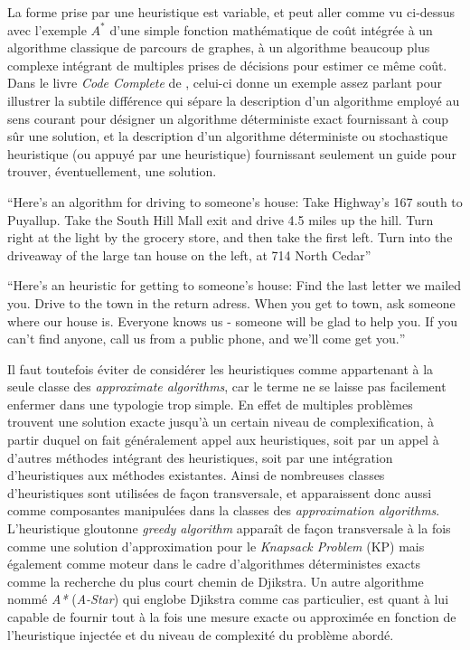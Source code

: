La forme prise par une heuristique est variable, et peut aller comme vu ci-dessus avec l'exemple $A^*$ d'une simple fonction mathématique de coût intégrée à un algorithme classique de parcours de graphes, à un algorithme beaucoup plus complexe intégrant de multiples prises de décisions pour estimer ce même coût. Dans le livre \textit{Code Complete} de \textcite[12]{McConnell2004}, celui-ci donne un exemple assez parlant pour illustrer la subtile différence qui sépare la description d'un algorithme employé au sens courant pour désigner un algorithme déterministe exact fournissant à coup sûr une solution, et la description d'un algorithme déterministe ou stochastique heuristique (ou appuyé par une heuristique) fournissant seulement un guide pour trouver, éventuellement, une solution.

\foreignquote{english}{Here's an algorithm for driving to someone's house: Take Highway's 167 south to Puyallup. Take the South Hill Mall exit and drive 4.5 miles up the hill. Turn right at the light by the grocery store, and then take the first left. Turn into the driveaway of the large tan house on the left, at 714 North Cedar}

\foreignquote{english}{Here's an heuristic for getting to someone's house: Find the last letter we mailed you. Drive to the town in the return adress. When you get to town, ask someone where our house is. Everyone knows us - someone will be glad to help you. If you can't find anyone, call us from a public phone, and we'll come get you.}

Il faut toutefois éviter de considérer les heuristiques comme appartenant à la seule classe des \textit{approximate algorithms}, car le terme ne se laisse pas facilement enfermer dans une typologie trop simple. En effet de multiples problèmes trouvent une solution exacte jusqu'à un certain niveau de complexification, à partir duquel on fait généralement appel aux heuristiques, soit par un appel à d'autres méthodes intégrant des heuristiques, soit par une intégration d'heuristiques aux méthodes existantes. Ainsi de nombreuses classes d'heuristiques sont utilisées de façon transversale, et apparaissent donc aussi comme composantes manipulées dans la classes des \textit{approximation algorithms}. L'heuristique gloutonne \textit{greedy algorithm}  apparaît de façon transversale à la fois comme une solution d'approximation pour le \textit{Knapsack Problem} (KP) mais également comme moteur dans le cadre d'algorithmes déterministes exacts comme la recherche du plus court chemin de Djikstra. Un autre algorithme nommé \textit{A*} (\textit{A-Star}) qui englobe Djikstra comme cas particulier, est quant à lui capable de fournir tout à la fois une mesure exacte ou approximée en fonction de l'heuristique injectée et du niveau de complexité du problème abordé.

